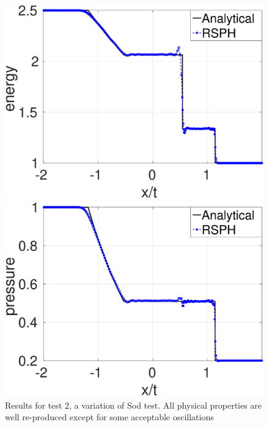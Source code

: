 \begin{figure}
\begin{minipage}{.415\textwidth}
        \includegraphics[width=0.99 \textwidth]{./Chapter-4/Figures/GSPH-Sod/GRod-RCM-e}
    \end{minipage}%
    \begin{minipage}{.415 \textwidth}
        \centering
        \includegraphics[width=0.99 \textwidth]{./Chapter-4/Figures/GSPH-Sod/GRod-RCM-p}
    \end{minipage}%
    \caption{Results for test 2, a variation of Sod test. All physical properties are well re-produced except for some acceptable oscillations}
    \label{fig:RCM-GSPH-Sod}
\end{figure}

